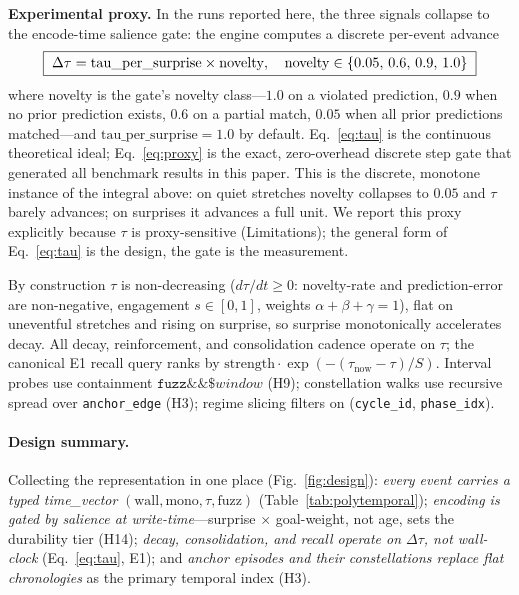 \documentclass[letterpaper]{article}
\begin{document}
\textbf{Experimental proxy.} In the runs reported here, the three signals collapse to the encode-time salience gate: the engine computes a discrete per-event advance
\begin{equation}\resizebox{0.9\columnwidth}{!}{$\boxed{\;\Delta\tau = \text{tau\_per\_surprise}\times \text{novelty},
\quad
\text{novelty}\in\{0.05,\,0.6,\,0.9,\,1.0\}\;}$}\label{eq:proxy}
\end{equation}
where novelty is the gate's novelty class---$1.0$ on a violated prediction, $0.9$ when no prior prediction exists, $0.6$ on a partial match, $0.05$ when all prior predictions matched---and $\text{tau\_per\_surprise}=1.0$ by default. Eq.~\ref{eq:tau} is the continuous theoretical ideal; Eq.~\ref{eq:proxy} is the exact, zero-overhead discrete step gate that generated all benchmark results in this paper. This is the discrete, monotone instance of the integral above: on quiet stretches novelty collapses to $0.05$ and $\tau$ barely advances; on surprises it advances a full unit. We report this proxy explicitly because $\tau$ is proxy-sensitive (Limitations); the general form of Eq.~\ref{eq:tau} is the design, the gate is the measurement.

By construction $\tau$ is non-decreasing ($d\tau/dt \ge 0$: novelty-rate and prediction-error are non-negative, engagement $s\in[0,1]$, weights $\alpha+\beta+\gamma=1$), flat on uneventful stretches and rising on surprise, so surprise monotonically accelerates decay. All decay, reinforcement, and consolidation cadence operate on $\tau$; the canonical E1 recall query ranks by $\text{strength}\cdot \exp(-(\tau_{\text{now}}-\tau)/S)$. Interval probes use containment $\texttt{fuzz} \&\& \$window$ (H9); constellation walks use recursive spread over \texttt{anchor\_edge} (H3); regime slicing filters on (\texttt{cycle\_id}, \texttt{phase\_idx}).

\paragraph{Design summary.} Collecting the representation in one place
(Fig.~\ref{fig:design}): \emph{every event carries a typed time\_vector}
$(\text{wall}, \text{mono}, \tau, \text{fuzz})$ (Table~\ref{tab:polytemporal});
\emph{encoding is gated by salience at write-time}---surprise $\times$
goal-weight, not age, sets the durability tier (H14); \emph{decay,
consolidation, and recall operate on $\Delta\tau$, not wall-clock}
(Eq.~\ref{eq:tau}, E1); and \emph{anchor episodes and their constellations
replace flat chronologies} as the primary temporal index (H3).
\end{document}
